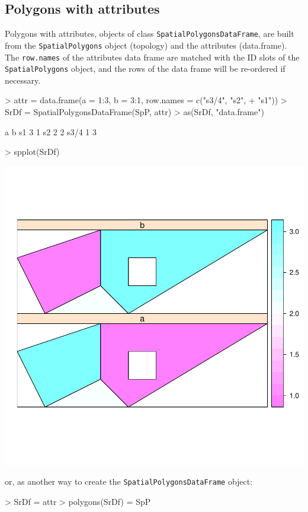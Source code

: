 \documentclass{article}
\begin{document}
\subsection{Polygons with attributes}
Polygons with attributes, objects of class {\tt SpatialPolygonsDataFrame},
are built from the {\tt SpatialPolygons} object (topology) and the attributes
(data.frame). The {\tt row.names} of the attributes data frame are matched with the ID slots of the {\tt SpatialPolygons} object, and the rows of the data frame will be re-ordered if necessary.
\begin{Schunk}
\begin{Sinput}
> attr = data.frame(a = 1:3, b = 3:1, row.names = c("s3/4", "s2", 
+     "s1"))
> SrDf = SpatialPolygonsDataFrame(SpP, attr)
> as(SrDf, "data.frame")
\end{Sinput}
\begin{Soutput}
     a b
s1   3 1
s2   2 2
s3/4 1 3

\end{Soutput}
\begin{Sinput}
> spplot(SrDf)
\end{Sinput}
\end{Schunk}

\includegraphics{sp-025}

or, as another way to create the {\tt SpatialPolygonsDataFrame} object:
\begin{Schunk}
\begin{Sinput}
> SrDf = attr
> polygons(SrDf) = SpP
\end{Sinput}
\end{Schunk}
\end{document}

